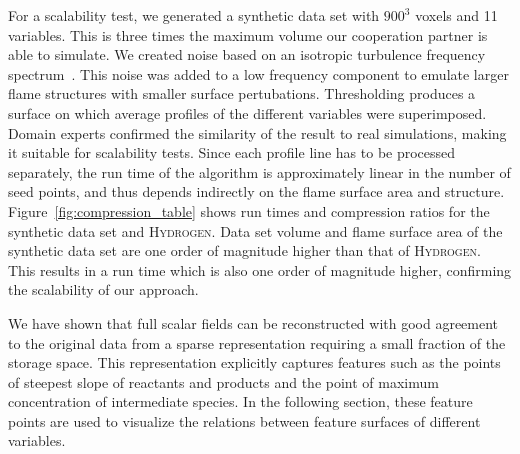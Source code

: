 For a scalability test, we generated a synthetic data set with $\text{900}^3$ voxels
and 11 variables. This is three times the maximum volume our cooperation
partner is able to simulate. We created noise based on an isotropic turbulence
frequency spectrum~\cite{Ferrante2003}. This noise was added to a low frequency
component to emulate larger flame structures with smaller surface pertubations.
Thresholding produces a surface on which average profiles of the different
variables were superimposed. Domain experts confirmed the similarity of the
result to real simulations, making it suitable for scalability tests.
Since each profile line has to be processed separately, the run time of the
algorithm is approximately linear in the number of seed points, and thus depends
indirectly on the flame surface area and structure.
Figure~\ref{fig:compression_table} shows run times and compression ratios for
the synthetic data set and \textsc{Hydrogen}. Data set volume and flame surface
area of the synthetic data set are one order of magnitude higher than that of
\textsc{Hydrogen}. This results in a run time which is also one order of
magnitude higher, confirming the scalability of our approach.

We have shown that full scalar fields can be reconstructed with good agreement
to the original data from a sparse representation requiring a small fraction of
the storage space. This representation explicitly captures features such
as the points of steepest slope of reactants and products and the point
of maximum concentration of intermediate species. In the following section,
these feature points are used to visualize the relations between feature
surfaces of different variables.
%
%
%

